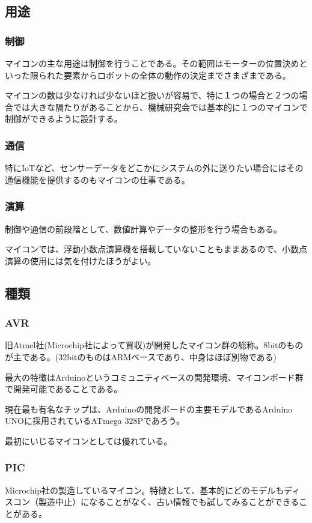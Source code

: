 \documentclass[a4paper,titlepage,here]{ujarticle}
\begin{document}
\subsection{用途}
\subsubsection{制御}
マイコンの主な用途は制御を行うことである。その範囲はモーターの位置決めといった限られた要素からロボットの全体の動作の決定までさまざまである。

マイコンの数は少なければ少ないほど扱いが容易で、特に１つの場合と２つの場合では大きな隔たりがあることから、機械研究会では基本的に１つのマイコンで制御ができるように設計する。
\subsubsection{通信}
特にIoTなど、センサーデータをどこかにシステムの外に送りたい場合にはその通信機能を提供するのもマイコンの仕事である。
\subsubsection{演算}
制御や通信の前段階として、数値計算やデータの整形を行う場合もある。

マイコンでは、浮動小数点演算機を搭載していないこともままあるので、小数点演算の使用には気を付けたほうがよい。
\subsection{種類}
\subsubsection{AVR}
旧Atmel社(Microchip社によって買収)が開発したマイコン群の総称。8bitのものが主である。(32bitのものはARMベースであり、中身はほぼ別物である)

最大の特徴はArduinoというコミュニティベースの開発環境、マイコンボード群で開発可能であることである。

現在最も有名なチップは、Arduinoの開発ボードの主要モデルであるArduino UNOに採用されているATmega 328Pであろう。

最初にいじるマイコンとしては優れている。
\subsubsection{PIC}
Microchip社の製造しているマイコン。特徴として、基本的にどのモデルもディスコン（製造中止）になることがなく、古い情報でも試してみることができることがある。
\end{document}
